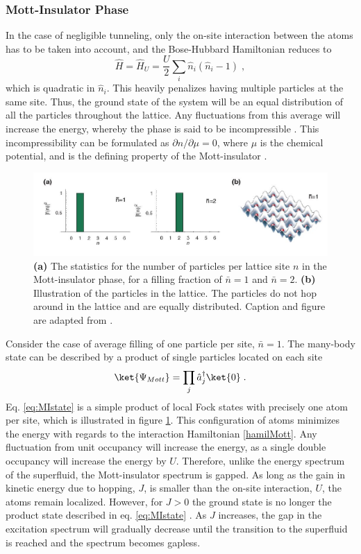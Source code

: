\subsubsection{Mott-Insulator Phase}
In the case of negligible tunneling, only the on-site interaction between the atoms has to be taken into account, and the Bose-Hubbard Hamiltonian reduces to
\begin{equation}
	\hat{H} = \hat{H}_U = \frac{U}{2} \sum_{i} \hat{n}_i \left( \hat{n}_i -1 \right) \; ,
	\label{hamilMott}
\end{equation}
which is quadratic in $\hat{n}_i$. This heavily penalizes having multiple particles at the same site. Thus, the ground state of the system will be an equal distribution of all the particles throughout the lattice. Any fluctuations from this average will increase the energy, whereby the phase is said to be incompressible \cite{Gemelke2009}. This incompressibility can be formulated as $\partial n / \partial \mu = 0$, where $\mu$ is the chemical potential, and is the defining property of the Mott-insulator \cite{manybodyBloch}.\\
\begin{figure}[!h]
\centering
\includegraphics[width=0.8\columnwidth]{Figures/f(n)_M.JPG} 
\caption{\textbf{(a)} The statistics for the number of particles per lattice site $n$ in the Mott-insulator phase, for a filling fraction of $\bar{n}=1$ and $\bar{n}=2$. \textbf{(b)} Illustration of the particles in the lattice. The particles do not hop around in the lattice and are equally distributed. Caption and figure are adapted from \cite{greiner}.}
\label{fig:f(n)_M} 
\end{figure}
Consider the case of average filling of one particle per site, $\bar{n} = 1$. The many-body state can be described by a product of single particles located on each site \cite{manybodyBloch}
\begin{equation}
	\ket{\Psi_{Mott}} = \prod_j \hat{a}_{j}^{\dag} \ket{0} \; .
	\label{eq:MIstate}
\end{equation}
Eq. \ref{eq:MIstate} is a simple product of local Fock states with precisely one atom per site, which is illustrated in figure \ref{fig:f(n)_M}. This configuration of atoms minimizes the energy with regards to the interaction Hamiltonian \eqref{hamilMott}. Any fluctuation from unit occupancy will increase the energy, as a single double occupancy will increase the energy by $U$. Therefore, unlike the energy spectrum of the superfluid, the Mott-insulator spectrum is gapped. As long as the gain in kinetic energy due to hopping, $J$, is smaller than the on-site interaction, $U$, the atoms remain localized. However, for $J > 0$ the ground state is no longer the product state described in eq. \eqref{eq:MIstate} \cite{manybodyBloch}. As $J$ increases, the gap in the excitation spectrum will gradually decrease until the transition to the superfluid is reached and the spectrum becomes gapless.\\

